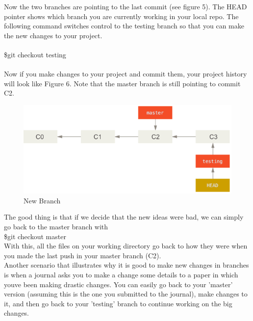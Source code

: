 \documentclass[12pt]{article}
\begin{document}
    \vspace{0.2 in}
    Now the two branches are pointing to the last commit (see figure 5). The HEAD pointer shows which branch you are currently working in your local repo.
    The following command switches control to the testing branch so that you can make the new changes to your project. \\
    \\
    \indent\indent \$git checkout testing \\
    \\
    Now if you make changes to your project and commit them, your project history will look like Figure 6. Note that the master branch is still pointing to commit C2.
    \vspace{0.2 in}
    \begin{figure}[h]
	\caption{New Branch}
	\includegraphics[scale=0.5]{figure6}
	\centering
    \end{figure} 
    \vspace{0.2 in}
    The good thing is that if we decide that the new ideas were bad, we can simply go back to the master branch with \\
    \indent\indent\$git checkout master \\
    With this, all the files on your working directory go back to how they were when you made the last push in your master branch (C2). \\
    Another scenario that illustrates why it is good to make new changes in branches is when a journal asks you to make a change some details to a paper in which you\textquotesingle ve been making drastic changes. You can easily go back to your 'master' version (assuming this is the one you submitted to the journal), make changes to it, and then go back to your 'testing' branch to continue working on the big changes.
\end{document}
